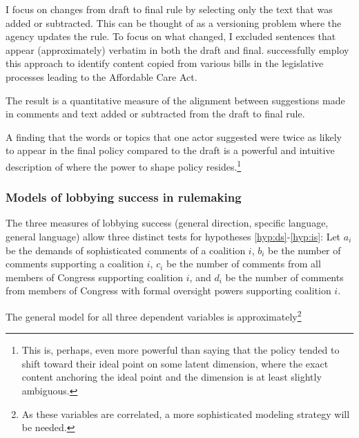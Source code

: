 I focus on changes from draft to final rule by selecting only the text that was added or subtracted. This can be thought of as a versioning problem where the agency updates the rule. To focus on what changed, I excluded sentences that appear (approximately) verbatim in both the draft and final. %
\citet{Wilkerson2015} successfully employ this approach to identify content copied from various bills in the legislative processes leading to the Affordable Care Act.

The result is a quantitative measure of the alignment between suggestions made in comments and text added or subtracted from the draft to final rule. %

A finding that the words or topics that one actor suggested were twice as likely to appear in the final policy compared to the draft is a powerful and intuitive description of where the power to shape policy resides.\footnote{This is, perhaps, even more powerful than saying that the policy tended to shift toward their ideal point on some latent dimension, where the exact content anchoring the ideal point and the dimension is at least slightly ambiguous.}

\subsubsection{Models of lobbying success in rulemaking}

The three measures of lobbying success (general direction, specific language, general language) allow three distinct tests for hypotheses \ref{hyp:ds}-\ref{hyp:is}:
Let $a_i$ be the demands of sophisticated comments of a coalition $i$, $b_i$ be the number of comments supporting a coalition $i$, $c_i$ be the number of comments from all members of Congress supporting coalition $i$, and $d_i$ be the number of comments from members of Congress with formal oversight powers supporting coalition $i$.

The general model for all three dependent variables is approximately\footnote{As these variables are correlated, a more sophisticated modeling strategy will be needed.} 

